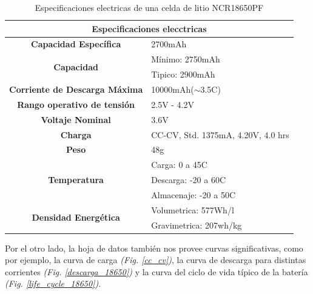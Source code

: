 \documentclass[10pt,a4paper]{article}
\begin{document}
	\begin{table}[h!]
		\begin{center}
			\begin{tabular}{|c|l|}
				\hline
                \multicolumn{2}{|c|}{Especificaciones elecctricas}                          \\ \hline
				\textbf{Capacidad Específica}                 & 2700mAh                            \\ \hline
				\multirow{2}{*}{\textbf{Capacidad}}           & Mínimo: 2750mAh                    \\ \cline{2-2} 
				& Tipico: 2900mAh                    \\ \hline
				\textbf{Corriente de Descarga Máxima}         & 10000mAh($\sim$3.5C)               \\ \hline
				\textbf{Rango operativo de tensión}           & 2.5V - 4.2V                        \\ \hline
				\textbf{Voltaje Nominal}                      & 3.6V                               \\ \hline
				\textbf{Charga}                               & CC-CV, Std. 1375mA, 4.20V, 4.0 hrs \\ \hline
				\textbf{Peso}                                 & 48g                              \\ \hline
				\multirow{3}{*}{\textbf{Temperatura}}         & Carga: 0 a 45C                     \\ \cline{2-2} 
				& Descarga: -20 a 60C                \\ \cline{2-2} 
				& Almacenaje: -20 a 50C              \\ \hline
				\multirow{2}{*}{\textbf{Densidad Energética}} & Volumetrica: 577Wh/l               \\ \cline{2-2} 
				& Gravimetrica: 207wh/kg             \\ \hline
			\end{tabular}%
            \caption{Especificaciones electricas de una celda de litio NCR18650PF}
            \label{ncr_table}
		\end{center}
	\end{table}
	
	\noindent Por el otro lado, la hoja de datos también nos provee curvas 
    significativas, como por ejemplo, la curva de carga 
    \emph{(Fig. \ref{cc_cv})}, la curva de descarga para distintas corrientes 
    \emph{(Fig. \ref{descarga_18650})} y la curva del ciclo de vida típico de 
    la batería \emph{(Fig. \ref{life_cycle_18650})}.
\end{document}
